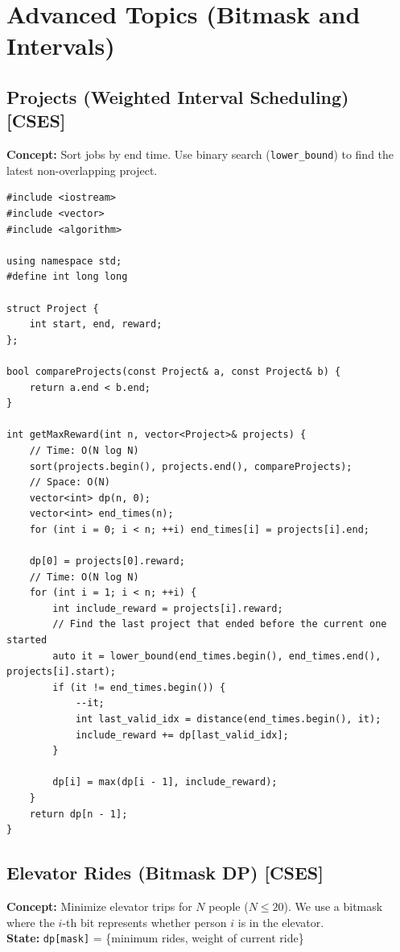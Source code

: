\section{Advanced Topics (Bitmask and Intervals)}

\subsection{Projects (Weighted Interval Scheduling) [CSES]}
\textbf{Concept:} Sort jobs by end time.
Use binary search (\texttt{lower\_bound}) to find the latest non-overlapping project.

\begin{lstlisting}
#include <iostream>
#include <vector>
#include <algorithm>

using namespace std;
#define int long long

struct Project {
    int start, end, reward;
};

bool compareProjects(const Project& a, const Project& b) {
    return a.end < b.end;
}

int getMaxReward(int n, vector<Project>& projects) {
    // Time: O(N log N)
    sort(projects.begin(), projects.end(), compareProjects);
    // Space: O(N)
    vector<int> dp(n, 0);
    vector<int> end_times(n);
    for (int i = 0; i < n; ++i) end_times[i] = projects[i].end;
    
    dp[0] = projects[0].reward;
    // Time: O(N log N)
    for (int i = 1; i < n; ++i) {
        int include_reward = projects[i].reward;
        // Find the last project that ended before the current one started
        auto it = lower_bound(end_times.begin(), end_times.end(), projects[i].start);
        if (it != end_times.begin()) {
            --it;
            int last_valid_idx = distance(end_times.begin(), it);
            include_reward += dp[last_valid_idx];
        }
        
        dp[i] = max(dp[i - 1], include_reward);
    }
    return dp[n - 1];
}
\end{lstlisting}

\subsection{Elevator Rides (Bitmask DP) [CSES]}
\textbf{Concept:} Minimize elevator trips for $N$ people ($N \le 20$).
We use a bitmask where the $i$-th bit represents whether person $i$ is in the elevator.
\\
\textbf{State:} \texttt{dp[mask]} = \{minimum rides, weight of current ride\}

